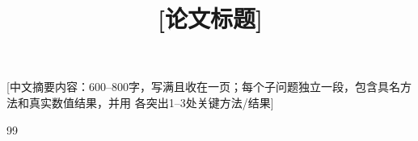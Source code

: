 \documentclass[withoutpreface,bwprint]{cumcmthesis}
\title{[论文标题]}
\makeatletter
\renewenvironment{abstract}{%
  \if@twocolumn\section*{\abstractname}%
  \else\begin{center}{\zihao{4}\bfseries \abstractname\vspace{-.5em}\vspace{\z@}}\end{center}\quotation
  \fi}{\if@twocolumn\else\endquotation\newpage\fi}
\makeatother
\begin{document}
\maketitle

\begin{abstract}

[中文摘要内容：600--800字，写满且收在一页；每个子问题独立一段，包含具名方法和真实数值结果，并用 \textbf{} 各突出1--3处关键方法/结果]

\keywords{[关键词1]\quad [关键词2]\quad [关键词3]}
\end{abstract}

\clearpage











\begin{thebibliography}{99}
\end{thebibliography}

\begin{appendices}

\end{appendices}
\end{document}
